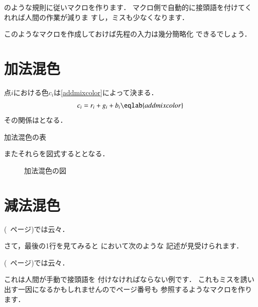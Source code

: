 のような規則に従いマクロを作ります．
マクロ側で自動的に接頭語を付けてくれれば人間の作業が減りま
すし，ミスも少なくなります．

\begin{InTeX}
\newcommand*{\chaplab}[1]{\label{chap:#1}}
\newcommand*{\chapref}[1]{第~\ref{chap:#1}~章}
\newcommand*{\seclab}[1]{\label{sec:#1}}
\newcommand*{\secref}[1]{\ref{sec:#1}~節}
\newcommand*{\figlab}[1]{\label{fig:#1}}
\newcommand*{\figref}[1]{図~\ref{fig:#1}}
\newcommand*{\tablab}[1]{\label{tab:#1}}
\newcommand*{\tabref}[1]{表~\ref{tab:#1}}
\newcommand*{\equlab}[1]{\label{equ:#1}}
\newcommand*{\equref}[1]{式~\ref{equ:#1}}
\end{InTeX}

このようなマクロを作成しておけば先程の入力は幾分簡略化
できるでしょう．

\begin{InTeX}
\section{加法混色}
点$i$における色$c_i$は\eqref{addmixcolor}によって決まる．
\begin{equation}
 c_i  =  r_i + g_i + b_i\eqlab{addmixcolor}
\end{equation}
その関係はとなる．
\begin{table}[htbp]
 \caption{加法混色の表}
\end{table}
またそれらを図式するととなる．
\begin{figure}[htbp]
 \caption{加法混色の図}
\end{figure}
\section{減法混色}
(\pageref{sec:addmixcolor}~ページ)では云々．
\end{InTeX}

さて，最後の1行を見てみると において次のような
記述が見受けられます．

\begin{InTeX}
(\pageref{sec:addmixcolor}~ページ)では云々．
\end{InTeX}

これは人間が手動で接頭語を
付けなければならない例です．
これもミスを誘い出す一因になるかもしれませんのでページ番号も
参照するようなマクロを作ります．

